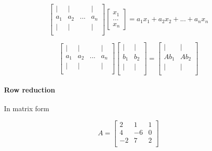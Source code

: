 \documentclass[12pt]{article}
\newcommand{\<}{\langle}
\renewcommand{\>}{\rangle}
\begin{document}
\[
	\begin{bmatrix}
		| & | &  & | \\
		a_1 & a_2 & ... & a_n \\
		| & | &  & | \\
	\end{bmatrix}
		\begin{bmatrix}
		x_1 \\ ... \\ x_n
	\end{bmatrix} = 
	a_1x_1+a_2x_2+...+a_nx_n
\]

\[
	\begin{bmatrix}
		| & | &  & | \\
		a_1 & a_2 & ... & a_n \\
		| & | &  & | \\
	\end{bmatrix}
	\begin{bmatrix}
		| &| \\
		b_1 & b_2 \\
		| & | \\
	\end{bmatrix} = 
	\begin{bmatrix}
		| & | \\
		Ab_1 & Ab_2 \\
		| & | \\
	\end{bmatrix} 
\]

\paragraph{Row reduction} In matrix form

\[
	A = \begin{bmatrix}
		2 & 1 & 1 \\
		4 & -6 & 0 \\
		-2 & 7 & 2 \\
	\end{bmatrix}
\]
\end{document}
